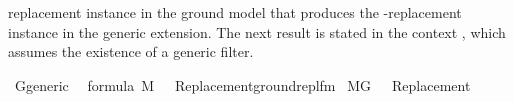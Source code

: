 replacement instance in the ground model that produces the
\isa{{\isasymphi}}-replacement instance in the generic extension. The next
result is stated in the context , which assumes
the existence of a generic filter.
%
\begin{isabelle}%
\isamarkupfalse%
\ G{\isacharunderscore}{\kern0pt}generic{}\isanewline
{}\isanewline
\isanewline
{\isasymlbrakk}{\isasymphi}\ {\isasymin}\ formula{\isacharsemicolon}{\kern0pt}\ M{\isacharcomma}{\kern0pt}\ {\isacharbrackleft}{\kern0pt}{\isacharbrackright}{\kern0pt}\ {\isasymTurnstile}\ {\isasymcdot}Replacement{\isacharparenleft}{\kern0pt}ground{\isacharunderscore}{\kern0pt}repl{\isacharunderscore}{\kern0pt}fm{\isacharparenleft}{\kern0pt}{\isasymphi}{\isacharparenright}{\kern0pt}{\isacharparenright}{\kern0pt}{\isasymcdot}{\isasymrbrakk}\isanewline
{\isasymLongrightarrow}\ M{\isacharbrackleft}{\kern0pt}G{\isacharbrackright}{\kern0pt}{\isacharcomma}{\kern0pt}\ {\isacharbrackleft}{\kern0pt}{\isacharbrackright}{\kern0pt}\ {\isasymTurnstile}\ {\isasymcdot}Replacement{\isacharparenleft}{\kern0pt}{\isasymphi}{\isacharparenright}{\kern0pt}{\isasymcdot}%
\end{isabelle}%
\isamarkupfalse%
\ %

